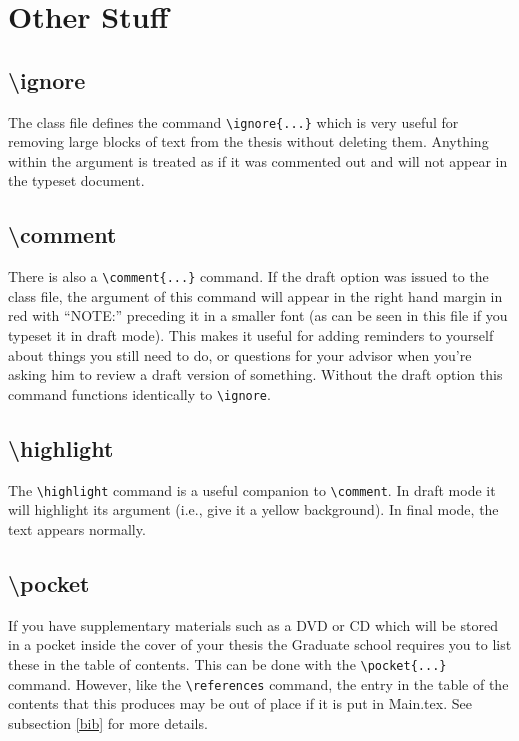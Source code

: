 \section{Other Stuff}
\subsection{\textbackslash ignore}
The class file defines the command \verb=\ignore{...}= which is very useful for removing large blocks of text from the thesis without deleting them.  Anything within the argument is treated as if it was commented out and will not appear in the typeset document.

\subsection{\textbackslash comment}
There is also a \verb=\comment{...}= command.  If the draft option was issued to the class file, the argument of this command will appear in the right hand margin in red with ``NOTE:'' preceding it in a smaller font (as can be seen in this file if you typeset it in draft mode).  This makes it useful for adding reminders to yourself about things you still need to do, or questions for your advisor when you're asking him to review a draft version of something.  Without the draft option this command functions identically to \verb=\ignore=.

\subsection{\textbackslash highlight}
The \verb=\highlight= command is a useful companion to \verb=\comment=.  In draft mode it will highlight its argument (i.e., give it a yellow background).  In final mode, the text appears normally.

\subsection{\textbackslash pocket}
If you have supplementary materials such as a DVD or CD which will be stored in a pocket inside the cover of your thesis the Graduate school requires you to list these in the table of contents.  This can be done with the \verb=\pocket{...}= command.  However, like the \verb=\references= command, the entry in the table of the contents that this produces may be out of place if it is put in Main.tex.  See subsection \ref{bib} for more details.

